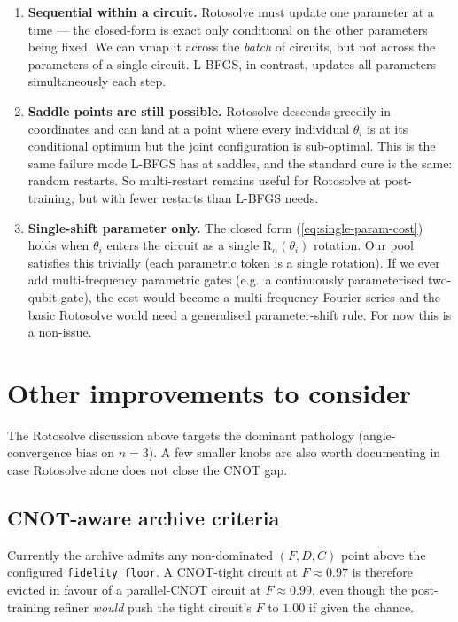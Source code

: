 \documentclass[11pt,a4paper]{article}
\begin{document}
\begin{enumerate}[leftmargin=2em]
\item \textbf{Sequential within a circuit.} Rotosolve must update one
parameter at a time --- the closed-form is exact only conditional on
the other parameters being fixed. We can vmap it across the
\emph{batch} of circuits, but not across the parameters of a single
circuit. L-BFGS, in contrast, updates all parameters simultaneously
each step.

\item \textbf{Saddle points are still possible.} Rotosolve descends
greedily in coordinates and can land at a point where every individual
$\theta_i$ is at its conditional optimum but the joint configuration is
sub-optimal. This is the same failure mode L-BFGS has at saddles, and
the standard cure is the same: random restarts. So multi-restart
remains useful for Rotosolve at post-training, but with fewer restarts
than L-BFGS needs.

\item \textbf{Single-shift parameter only.} The closed form
(\ref{eq:single-param-cost}) holds when $\theta_i$ enters the circuit as
a single $\mathrm{R}_\alpha(\theta_i)$ rotation. Our pool satisfies this
trivially (each parametric token is a single rotation). If we ever add
multi-frequency parametric gates (e.g.\ a continuously parameterised
two-qubit gate), the cost would become a multi-frequency Fourier series
and the basic Rotosolve would need a generalised parameter-shift rule.
For now this is a non-issue.
\end{enumerate}

\section{Other improvements to consider}

The Rotosolve discussion above targets the dominant pathology
(angle-convergence bias on $n = 3$). A few smaller knobs are also worth
documenting in case Rotosolve alone does not close the CNOT gap.

\subsection{CNOT-aware archive criteria}

Currently the archive admits any non-dominated $(F, D, C)$ point above
the configured \texttt{fidelity\_floor}. A CNOT-tight circuit at
$F \approx 0.97$ is therefore evicted in favour of a parallel-CNOT
circuit at $F \approx 0.99$, even though the post-training refiner
\emph{would} push the tight circuit's $F$ to $1.00$ if given the chance.
\end{document}
